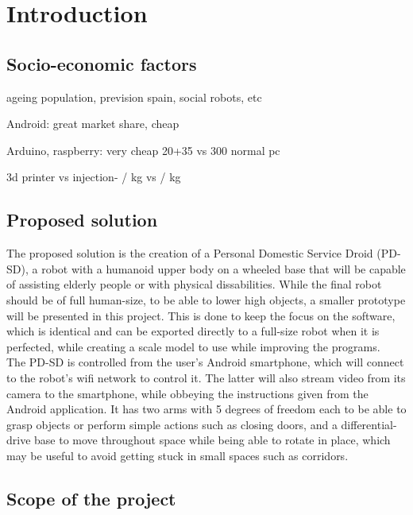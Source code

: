 \section{Introduction}




\subsection{Socio-economic factors}



ageing population, prevision spain, social robots, etc


Android: great market share, cheap

Arduino, raspberry: very cheap 20+35  vs 300 normal pc

3d printer vs injection- / kg vs / kg


\subsection{Proposed solution}
The proposed solution is the creation of a Personal Domestic Service Droid (PD-SD), a robot with a humanoid upper body on a wheeled base that will be capable of assisting elderly people or with physical dissabilities. While the final robot should be of full human-size, to be able to lower high objects, a smaller prototype will be presented in this project. This is done to keep the focus on the software, which is identical and can be exported directly to a full-size robot when it is perfected, while creating a scale model to use while improving the programs.\\

The PD-SD is controlled from the user's Android smartphone, which will connect to the robot's wifi network to control it. The latter will also stream video from its camera to the smartphone, while obbeying the instructions given from the Android application. It has two arms with 5 degrees of freedom each to be able to grasp objects or perform simple actions such as closing doors, and a differential-drive base to move throughout space while being able to rotate in place, which may be useful to avoid getting stuck in small spaces such as corridors.\\










\subsection{Scope of the project}

